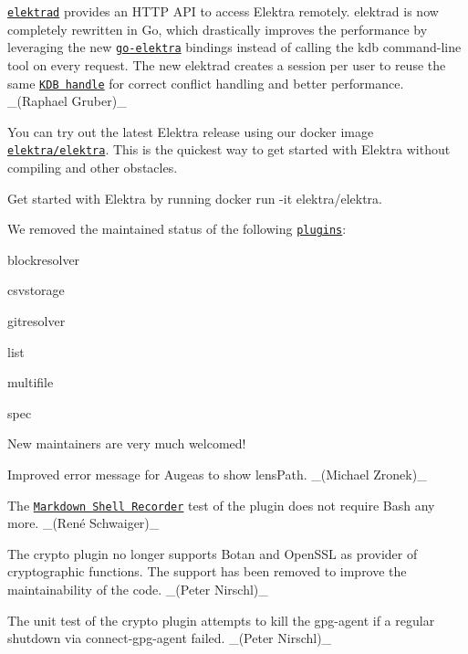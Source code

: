 \href{https://www.libelektra.org/tools/elektrad}{\tt elektrad} provides an H\+T\+TP A\+PI to access Elektra remotely. {\ttfamily elektrad} is now completely rewritten in Go, which drastically improves the performance by leveraging the new \href{https://github.com/ElektraInitiative/go-elektra/}{\tt go-\/elektra} bindings instead of calling the {\ttfamily kdb} command-\/line tool on every request. The new {\ttfamily elektrad} creates a session per user to reuse the same \href{https://doc.libelektra.org/api/latest/html/group__kdb.html}{\tt K\+DB handle} for correct conflict handling and better performance. \+\_\+(\+Raphael Gruber)\+\_\+

You can try out the latest Elektra release using our docker image \href{https://hub.docker.com/r/elektra/elektra}{\tt elektra/elektra}. This is the quickest way to get started with Elektra without compiling and other obstacles.

Get started with Elektra by running {\ttfamily docker run -\/it elektra/elektra}.

We removed the {\ttfamily maintained} status of the following \href{https://www.libelektra.org/plugins/readme}{\tt plugins}\+:


\begin{DoxyItemize}
\item blockresolver
\item csvstorage
\item gitresolver
\item list
\item multifile
\item spec
\end{DoxyItemize}

New maintainers are very much welcomed!


\begin{DoxyItemize}
\item Improved error message for Augeas to show lens\+Path. \+\_\+(\+Michael Zronek)\+\_\+
\end{DoxyItemize}


\begin{DoxyItemize}
\item The \href{https://master.libelektra.org/tests/shell/shell_recorder/tutorial_wrapper}{\tt Markdown Shell Recorder} test of the plugin does not require Bash any more. \+\_\+(René Schwaiger)\+\_\+
\end{DoxyItemize}


\begin{DoxyItemize}
\item The crypto plugin no longer supports Botan and Open\+S\+SL as provider of cryptographic functions. The support has been removed to improve the maintainability of the code. \+\_\+(\+Peter Nirschl)\+\_\+
\item The unit test of the crypto plugin attempts to kill the gpg-\/agent if a regular shutdown via {\ttfamily connect-\/gpg-\/agent} failed. \+\_\+(\+Peter Nirschl)\+\_\+
\end{DoxyItemize}



